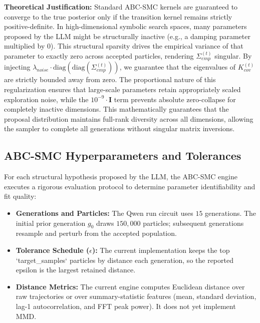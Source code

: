 \textbf{Theoretical Justification:} Standard ABC-SMC kernels are guaranteed to converge to the true posterior only if the transition kernel remains strictly positive-definite. In high-dimensional symbolic search spaces, many parameters proposed by the LLM might be structurally inactive (e.g., a damping parameter multiplied by $0$). This structural sparsity drives the empirical variance of that parameter to exactly zero across accepted particles, rendering $\Sigma_{emp}^{(t)}$ singular. By injecting $\lambda_{noise} \cdot \text{diag}(\text{diag}(\Sigma_{emp}^{(t)}))$, we guarantee that the eigenvalues of $K_{cov}^{(t)}$ are strictly bounded away from zero. The proportional nature of this regularization ensures that large-scale parameters retain appropriately scaled exploration noise, while the $10^{-9} \cdot \mathbf{I}$ term prevents absolute zero-collapse for completely inactive dimensions. This mathematically guarantees that the proposal distribution maintains full-rank diversity across all dimensions, allowing the sampler to complete all generations without singular matrix inversions.

\subsection{ABC-SMC Hyperparameters and Tolerances}
For each structural hypothesis proposed by the LLM, the ABC-SMC engine executes a rigorous evaluation protocol to determine parameter identifiability and fit quality:
\begin{itemize}
    \item \textbf{Generations and Particles:} The Qwen run circuit uses $15$ generations. The initial prior generation $g_0$ draws $150,000$ particles; subsequent generations resample and perturb from the accepted population.
    \item \textbf{Tolerance Schedule ($\epsilon$):} The current implementation keeps the top `target_samples` particles by distance each generation, so the reported epsilon is the largest retained distance.
    \item \textbf{Distance Metrics:} The current engine computes Euclidean distance over raw trajectories or over summary-statistic features (mean, standard deviation, lag-1 autocorrelation, and FFT peak power). It does not yet implement MMD.
\end{itemize}

